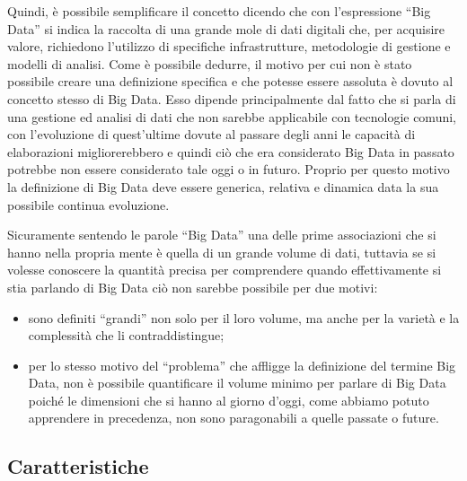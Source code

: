 Quindi, è possibile semplificare il concetto dicendo che con l'espressione “Big Data” si indica la raccolta di una grande mole di dati digitali che, per acquisire valore, richiedono l'utilizzo di specifiche infrastrutture, metodologie di gestione e modelli di analisi. Come è possibile dedurre, il motivo per cui non è stato possibile creare una definizione specifica e che potesse essere assoluta è dovuto al concetto stesso di Big Data. Esso dipende principalmente dal fatto che si parla di una gestione ed analisi di dati che non sarebbe applicabile con tecnologie comuni, con l'evoluzione di quest'ultime dovute al passare degli anni le capacità di elaborazioni migliorerebbero e quindi ciò che era considerato Big Data in passato potrebbe non essere considerato tale oggi o in futuro. Proprio per questo motivo la definizione di Big Data deve essere generica, relativa e dinamica data la sua possibile continua evoluzione.

Sicuramente sentendo le parole “Big Data” una delle prime associazioni che si hanno nella propria mente è quella di un grande volume di dati, tuttavia se si volesse conoscere la quantità precisa per comprendere quando effettivamente si stia parlando di Big Data ciò non sarebbe possibile per due motivi:

\begin{itemize}
    \item sono definiti “grandi” non solo per il loro volume, ma anche per la varietà e la complessità che li contraddistingue;
    \item per lo stesso motivo del “problema” che affligge la definizione del termine Big Data, non è possibile quantificare il volume minimo per parlare di Big Data poiché le dimensioni che si hanno al giorno d'oggi, come abbiamo potuto apprendere in precedenza, non sono paragonabili a quelle passate o future.
\end{itemize}

\subsection{Caratteristiche}

